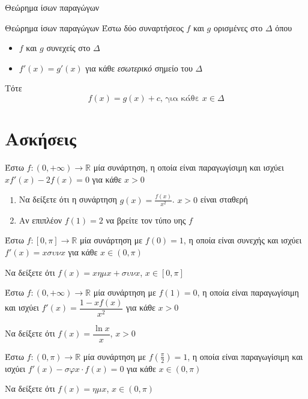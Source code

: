 \documentclass{presentation}
\begin{document}
\begin{frame}{Θεώρημα ίσων παραγώγων}
    \begin{block}{Θεώρημα ίσων παραγώγων}
        Έστω δύο συναρτήσεος $f$ και $g$ ορισμένες στο $Δ$ όπου
        \begin{itemize}
            \item $f$ και $g$ συνεχείς στο $Δ$
            \item $f'(x)=g'(x)$ για κάθε \emph{εσωτερικό} σημείο του $Δ$
        \end{itemize}
        Τότε
        $$f(x)=g(x)+c \text{, για κάθε } x\in Δ$$
    \end{block}
\end{frame}

\section{Ασκήσεις}
\begin{askisi}
    Έστω $f:(0,+\infty)\to\mathbb{R}$ μία συνάρτηση, η οποία είναι παραγωγίσιμη και ισχύει $xf'(x)-2f(x)=0$ για κάθε $x>0$
    \begin{enumerate}
        \item<1-> Να δείξετε ότι η συνάρτηση $g(x)=\frac{f(x)}{x^2}$. $x>0$ είναι σταθερή
        \item<2-> Αν επιπλέον $f(1)=2$ να βρείτε τον τύπο υης $f$
    \end{enumerate}

\end{askisi}

\begin{askisi}
    Έστω $f:[0,π]\to\mathbb{R}$ μία συνάρτηση με $f(0)=1$, η οποία είναι συνεχής και ισχύει $f'(x)=xσυνx$ για κάθε $x\in (0,π)$

    Να δείξετε ότι $f(x)=xημx+συνx$, $x\in [0,π]$

\end{askisi}

\begin{askisi}
    Έστω $f:(0,+\infty)\to\mathbb{R}$ μία συνάρτηση με $f(1)=0$, η οποία είναι παραγωγίσιμη και ισχύει $f'(x)=\dfrac{1-xf(x)}{x^2}$ για κάθε $x>0$

    Να δείξετε ότι $f(x)=\dfrac{\ln x}{x}$, $x>0$

\end{askisi}

\begin{askisi}
    Έστω $f:(0,π)\to\mathbb{R}$ μία συνάρτηση με $f(\frac{π}{2})=1$, η οποία είναι παραγωγίσιμη και ισχύει $f'(x)-σφx\cdot f(x)=0$ για κάθε $x\in (0,π)$

    Να δείξετε ότι $f(x)=ημx$, $x\in (0,π)$

\end{askisi}
\end{document}
